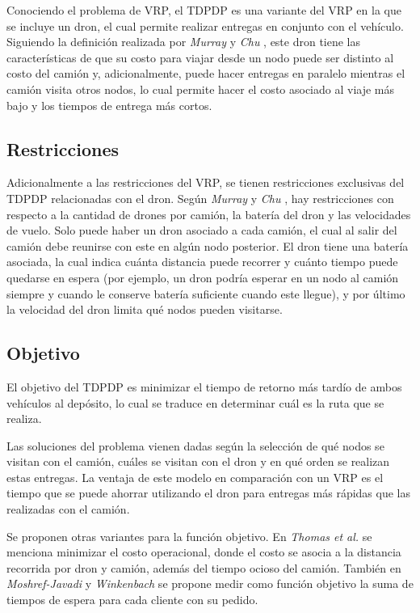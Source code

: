 Conociendo el problema de VRP, el TDPDP es una variante del VRP en la que se incluye un dron, el cual permite realizar entregas en conjunto con el vehículo. Siguiendo la definición realizada por \textit{Murray} y \textit{Chu} \cite{Murray2015Flying}, este dron tiene las características de que su costo para viajar desde un nodo puede ser distinto al costo del camión y, adicionalmente, puede hacer entregas en paralelo mientras el camión visita otros nodos, lo cual permite hacer el costo asociado al viaje más bajo y los tiempos de entrega más cortos. 

\subsection{Restricciones}

Adicionalmente a las restricciones del VRP, se tienen restricciones exclusivas del TDPDP relacionadas con el dron. Según \textit{Murray} y \textit{Chu} \cite{Murray2015Flying}, hay restricciones con respecto a la cantidad de drones por camión, la batería del dron y las velocidades de vuelo. Solo puede haber un dron asociado a cada camión, el cual al salir del camión debe reunirse con este en algún nodo posterior. El dron tiene una batería asociada, la cual indica cuánta distancia puede recorrer y cuánto tiempo puede quedarse en espera (por ejemplo, un dron podría esperar en un nodo al camión siempre y cuando le conserve batería suficiente cuando este llegue), y por último la velocidad del dron limita qué nodos pueden visitarse.

\subsection{Objetivo}

El objetivo del TDPDP es minimizar el tiempo de retorno más tardío de ambos vehículos al depósito, lo cual se traduce en determinar cuál es la ruta que se realiza. 

Las soluciones del problema vienen dadas según la selección de qué nodos se visitan con el camión, cuáles se visitan con el dron y en qué orden se realizan estas entregas. La ventaja de este modelo en comparación con un VRP es el tiempo que se puede ahorrar utilizando el dron para entregas más rápidas que las realizadas con el camión.

Se proponen otras variantes para la función objetivo. En \textit{Thomas et al.} \cite{thomas2024collaborative} se menciona minimizar el costo operacional, donde el costo se asocia a la distancia recorrida por dron y camión, además del tiempo ocioso del camión. También en \textit{Moshref-Javadi} y \textit{Winkenbach} \cite{moshrefjavadi2021applications} se propone medir como función objetivo la suma de tiempos de espera para cada cliente con su pedido.

